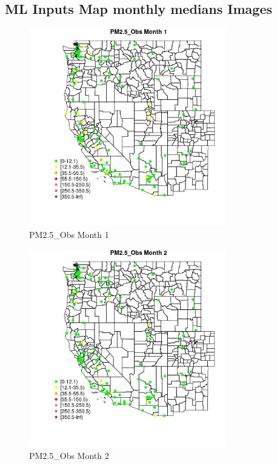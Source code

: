 
\subsection{ML Inputs Map monthly medians Images} 
 

\begin{figure} 
\centering  
\includegraphics[width=0.77\textwidth]{Code_Outputs/Report_ML_input_PM25_Step4_part_e_de_duplicated_aves_MapObsMo1PM25_Obs.jpg} 
\caption{\label{fig:Report_ML_input_PM25_Step4_part_e_de_duplicated_avesMapObsMo1PM25_Obs}PM2.5_Obs Month 1} 
\end{figure} 
 

\begin{figure} 
\centering  
\includegraphics[width=0.77\textwidth]{Code_Outputs/Report_ML_input_PM25_Step4_part_e_de_duplicated_aves_MapObsMo2PM25_Obs.jpg} 
\caption{\label{fig:Report_ML_input_PM25_Step4_part_e_de_duplicated_avesMapObsMo2PM25_Obs}PM2.5_Obs Month 2} 
\end{figure} 
 

